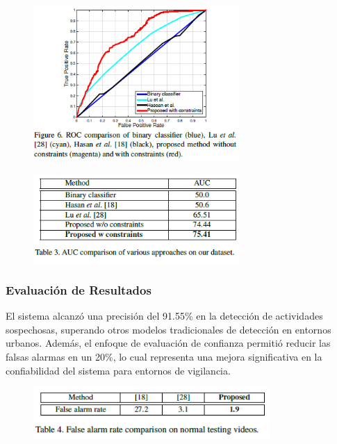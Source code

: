 \begin{figure}[h] %
    \centering
    \includegraphics[width=0.7\textwidth]{4/ent5.2.png} %
    \label{fig:ejemplo} %
\end{figure}

\begin{figure}[h] %
    \centering
    \includegraphics[width=0.7\textwidth]{4/ent5.3.png} %
    \label{fig:ejemplo} %
\end{figure}

\clearpage


\subsubsection{Evaluación de Resultados}
El sistema alcanzó una precisión del 91.55\% en la detección de actividades sospechosas, superando otros modelos tradicionales de detección en entornos urbanos. Además, el enfoque de evaluación de confianza permitió reducir las falsas alarmas en un 20\%, lo cual representa una mejora significativa en la confiabilidad del sistema para entornos de vigilancia.

\begin{figure}[h] %
    \centering
    \includegraphics[width=0.8\textwidth]{4/eva5.png} %
    \label{fig:ejemplo} %
\end{figure}

